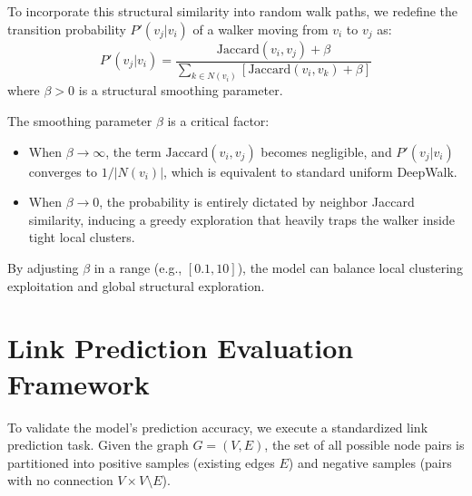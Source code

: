 To incorporate this structural similarity into random walk paths, we redefine the transition probability $P'(v_j | v_i)$ of a walker moving from $v_i$ to $v_j$ as:
\begin{equation}
    P'(v_j | v_i) = \frac{\text{Jaccard}(v_i, v_j) + \beta}{\sum_{k \in N(v_i)} [ \text{Jaccard}(v_i, v_k) + \beta ]}
\end{equation}
where $\beta > 0$ is a structural smoothing parameter.

The smoothing parameter $\beta$ is a critical factor:
\begin{itemize}
    \item When $\beta \to \infty$, the term $\text{Jaccard}(v_i, v_j)$ becomes negligible, and $P'(v_j | v_i)$ converges to $1 / |N(v_i)|$, which is equivalent to standard uniform DeepWalk.
    \item When $\beta \to 0$, the probability is entirely dictated by neighbor Jaccard similarity, inducing a greedy exploration that heavily traps the walker inside tight local clusters.
\end{itemize}

By adjusting $\beta$ in a range (e.g., $[0.1, 10]$), the model can balance local clustering exploitation and global structural exploration.

\section{Link Prediction Evaluation Framework}

To validate the model's prediction accuracy, we execute a standardized link prediction task. Given the graph $G=(V, E)$, the set of all possible node pairs is partitioned into positive samples (existing edges $E$) and negative samples (pairs with no connection $V \times V \setminus E$). 

